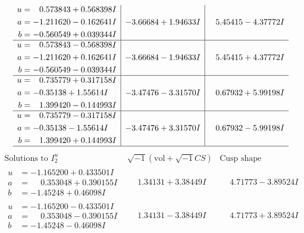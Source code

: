 \documentclass[1p]{elsarticle_modified}
\theoremstyle{definition}
\newcommand{\I}{\sqrt{-1}}
\begin{document}
$$\begin{array}{c|c|c}
\begin{aligned}
u &= \phantom{-}0.573843 + 0.568398 I \\
a &= -1.211620 - 0.162641 I \\
b &= -0.560549 + 0.039344 I\end{aligned}
 & -3.66684 + 1.94633 I & \phantom{-}5.45415 - 4.37772 I \\ \hline\begin{aligned}
u &= \phantom{-}0.573843 - 0.568398 I \\
a &= -1.211620 + 0.162641 I \\
b &= -0.560549 - 0.039344 I\end{aligned}
 & -3.66684 - 1.94633 I & \phantom{-}5.45415 + 4.37772 I \\ \hline\begin{aligned}
u &= \phantom{-}0.735779 + 0.317158 I \\
a &= -0.35138 + 1.55614 I \\
b &= \phantom{-}1.399420 - 0.144993 I\end{aligned}
 & -3.47476 - 3.31570 I & \phantom{-}0.67932 + 5.99198 I \\ \hline\begin{aligned}
u &= \phantom{-}0.735779 - 0.317158 I \\
a &= -0.35138 - 1.55614 I \\
b &= \phantom{-}1.399420 + 0.144993 I\end{aligned}
 & -3.47476 + 3.31570 I & \phantom{-}0.67932 - 5.99198 I\\
 \hline 
 \end{array}$$\newpage$$\begin{array}{c|c|c}  
\text{Solutions to }I^u_{2}& \I (\text{vol} + \sqrt{-1}CS) & \text{Cusp shape}\\
 \hline 
\begin{aligned}
u &= -1.165200 + 0.433501 I \\
a &= \phantom{-}0.353048 + 0.390155 I \\
b &= -1.45248 + 0.46098 I\end{aligned}
 & \phantom{-}1.34131 + 3.38449 I & \phantom{-}4.71773 - 3.89524 I \\ \hline\begin{aligned}
u &= -1.165200 - 0.433501 I \\
a &= \phantom{-}0.353048 - 0.390155 I \\
b &= -1.45248 - 0.46098 I\end{aligned}
 & \phantom{-}1.34131 - 3.38449 I & \phantom{-}4.71773 + 3.89524 I \\ \hline\begin{aligned}

\end{aligned}
\end{array}$$
\end{document}
